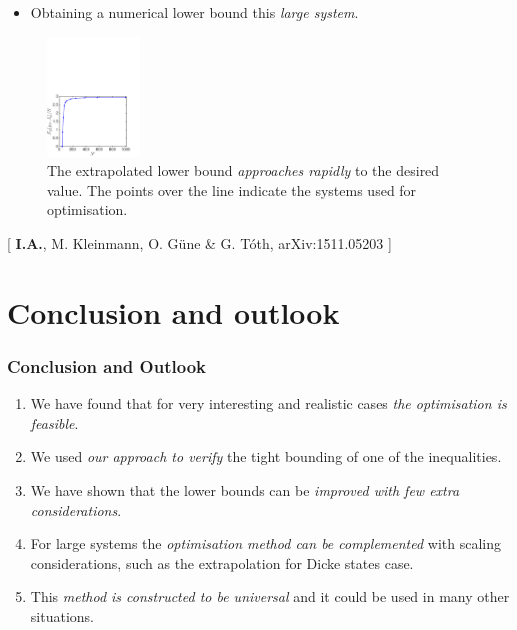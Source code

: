 \documentclass{beamer}
\newcommand{\citate}[1]{{\footnotesize{\color{gray}[ #1 ]}}

	}
\begin{document}
		\begin{frame}
			\begin{itemize}
				\item Obtaining a numerical lower bound this \emph{\color{blue}large system}.
			\end{itemize}
			\vspace{-10px}
			\begin{figure}
				\includegraphics[height=120px]{img/asymptoticapproach-dicke.pdf}
				\caption{The extrapolated lower bound \emph{\color{blue}approaches rapidly} to the desired value. The points over the line indicate the systems used for optimisation.}
			\end{figure}
			\vspace{-15px}
			\citate{\textbf{I.A.}, M. Kleinmann, O. G\"une \& G. T\'oth, arXiv:1511.05203}
		\end{frame}

\section{Conclusion and outlook}

	\begin{frame}
		\frametitle{Conclusion and Outlook}
		\begin{enumerate}
			\item<1-> We have found that for very interesting and realistic cases \emph{\color{blue}the optimisation is feasible}.
			\item<2-> We used \emph{\color{blue}our approach to verify} the tight bounding of one of the inequalities.
			\item<3-> We have shown that the lower bounds can be \emph{\color{blue}improved with few extra considerations}.
			\item<4-> For large systems the \emph{\color{blue}optimisation method can be complemented} with scaling considerations, such as the extrapolation for Dicke states case.
			\item<5-> This \emph{\color{blue}method is constructed to be universal} and it could be used in many other situations.
		\end{enumerate}

	\end{frame}
\end{document}
